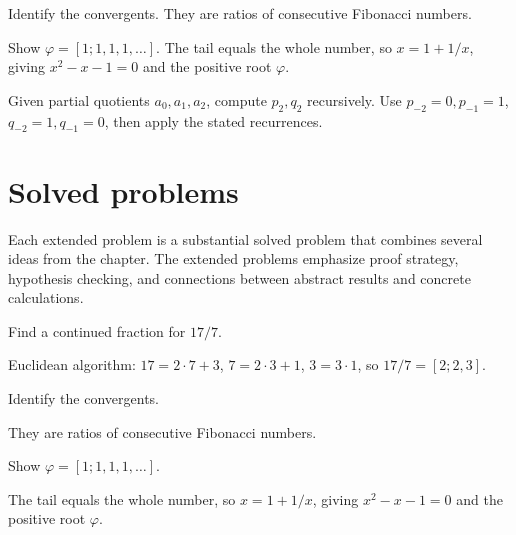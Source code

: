 \begin{example}\label{ex:ii25-worked-02}
Identify the convergents. They are ratios of consecutive Fibonacci numbers.
\end{example}

\begin{example}\label{ex:ii25-worked-03}
Show $\varphi=[1;1,1,1,\dots]$. The tail equals the whole number, so $x=1+1/x$, giving $x^2-x-1=0$ and the positive root $\varphi$.
\end{example}

\begin{example}\label{ex:ii25-worked-04}
Given partial quotients $a_0,a_1,a_2$, compute $p_2,q_2$ recursively. Use $p_{-2}=0,p_{-1}=1$, $q_{-2}=1,q_{-1}=0$, then apply the stated recurrences.
\end{example}

\section{Solved problems}
Each extended problem is a substantial solved problem that combines several ideas from the chapter. The extended problems emphasize proof strategy, hypothesis checking, and connections between abstract results and concrete calculations.

\begin{problem}\label{prob:ii25-problem-01}
Find a continued fraction for $17/7$.
\end{problem}
\begin{solution}
Euclidean algorithm: $17=2\cdot7+3$, $7=2\cdot3+1$, $3=3\cdot1$, so $17/7=[2;2,3]$.
\end{solution}

\begin{problem}\label{prob:ii25-problem-02}
Identify the convergents.
\end{problem}
\begin{solution}
They are ratios of consecutive Fibonacci numbers.
\end{solution}

\begin{problem}\label{prob:ii25-problem-03}
Show $\varphi=[1;1,1,1,\dots]$.
\end{problem}
\begin{solution}
The tail equals the whole number, so $x=1+1/x$, giving $x^2-x-1=0$ and the positive root $\varphi$.
\end{solution}

